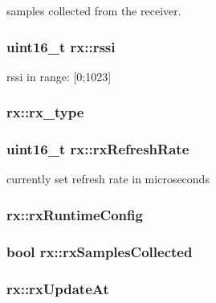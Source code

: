 samples collected from the receiver. 

\hypertarget{structrx_a155f20d2c3e9ded0c967dfbea2a5f696}{
\subsubsection[{rssi}]{\setlength{\rightskip}{0pt plus 5cm}uint16\+\_\+t rx\+::rssi}}\label{structrx_a155f20d2c3e9ded0c967dfbea2a5f696}


rssi in range\+: \mbox{[}0;1023\mbox{]} 

\hypertarget{structrx_af96957ebd169646f00b8b79314abd0f1}{
\subsubsection[{rx\+\_\+type}]{ rx\+::rx\+\_\+type}}\label{structrx_af96957ebd169646f00b8b79314abd0f1}
\hypertarget{structrx_a3aade475c0c219609047fba39dce9a2a}{
\subsubsection[{rx\+Refresh\+Rate}]{\setlength{\rightskip}{0pt plus 5cm}uint16\+\_\+t rx\+::rx\+Refresh\+Rate}}\label{structrx_a3aade475c0c219609047fba39dce9a2a}


currently set refresh rate in microseconds 

\hypertarget{structrx_a72a978d821ed96dde83bf645e959baa3}{
\subsubsection[{rx\+Runtime\+Config}]{ rx\+::rx\+Runtime\+Config}}\label{structrx_a72a978d821ed96dde83bf645e959baa3}
\hypertarget{structrx_a5f44281e15335180cbe0cd7e4380e908}{
\subsubsection[{rx\+Samples\+Collected}]{\setlength{\rightskip}{0pt plus 5cm}bool rx\+::rx\+Samples\+Collected}}\label{structrx_a5f44281e15335180cbe0cd7e4380e908}
\hypertarget{structrx_a4904303fe43a4e45a4aca28807d57cc2}{
\subsubsection[{rx\+Update\+At}]{ rx\+::rx\+Update\+At}}\label{structrx_a4904303fe43a4e45a4aca28807d57cc2}



